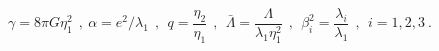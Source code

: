 \begin{equation}
\gamma=8\pi G\eta_1^2 \ \ , \ \alpha=e^2/\lambda_1 \ \ , \ \ 
q=\frac{\eta_2}{\eta_1} \ \ , \ \ {\bar\Lambda}=
\frac\Lambda{\lambda_1\eta_1^2} \ \ , \ \
\beta_i^2=\frac{\lambda_i}{\lambda_1} \ \ , \ \ i=1,2,3 \ .
\end{equation}

